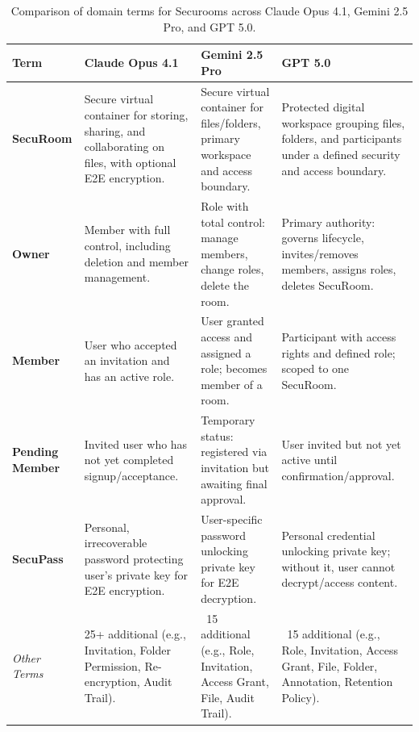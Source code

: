 \begin{table}[H]
    \centering
    \begin{tabular}{|p{2.5cm}|p{4cm}|p{4cm}|p{4cm}|}
    \hline
    \rowcolor{gray!20}
    \textbf{Term} & \textbf{Claude Opus 4.1} & \textbf{Gemini 2.5 Pro} & \textbf{GPT 5.0} \\
    \hline
    \textbf{SecuRoom} & 
    Secure virtual container for storing, sharing, and collaborating on files, with optional E2E encryption. &
    Secure virtual container for files/folders, primary workspace and access boundary. &
    Protected digital workspace grouping files, folders, and participants under a defined security and access boundary. \\
    \hline
    \textbf{Owner} & 
    Member with full control, including deletion and member management. &
    Role with total control: manage members, change roles, delete the room. &
    Primary authority: governs lifecycle, invites/removes members, assigns roles, deletes SecuRoom. \\
    \hline
    \textbf{Member} & 
    User who accepted an invitation and has an active role. &
    User granted access and assigned a role; becomes member of a room. &
    Participant with access rights and defined role; scoped to one SecuRoom. \\
    \hline
    \textbf{Pending Member} & 
    Invited user who has not yet completed signup/acceptance. &
    Temporary status: registered via invitation but awaiting final approval. &
    User invited but not yet active until confirmation/approval. \\
    \hline
    \textbf{SecuPass} & 
    Personal, irrecoverable password protecting user's private key for E2E encryption. &
    User-specific password unlocking private key for E2E decryption. &
    Personal credential unlocking private key; without it, user cannot decrypt/access content. \\
    \hline
    \rowcolor{gray!10}
    \textit{Other Terms} & 
    25+ additional (e.g., Invitation, Folder Permission, Re-encryption, Audit Trail). &
    ~15 additional (e.g., Role, Invitation, Access Grant, File, Audit Trail). &
    ~15 additional (e.g., Role, Invitation, Access Grant, File, Folder, Annotation, Retention Policy). \\
    \hline
    \end{tabular}
    \caption{Comparison of domain terms for Securooms across Claude Opus 4.1, Gemini 2.5 Pro, and GPT 5.0.}
    \label{tab:securooms-ubiquitous-language}
\end{table}


